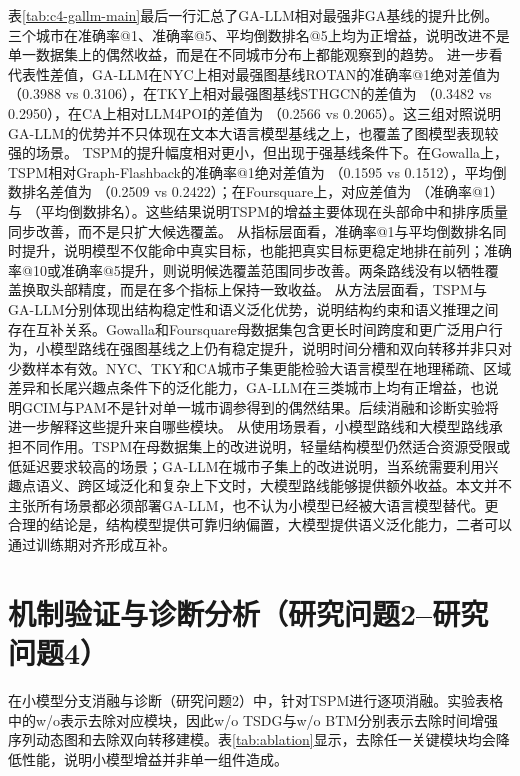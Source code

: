表\ref{tab:c4-gallm-main}最后一行汇总了GA-LLM相对最强非GA基线的提升比例。三个城市在准确率@1、准确率@5、平均倒数排名@5上均为正增益，说明改进不是单一数据集上的偶然收益，而是在不同城市分布上都能观察到的趋势。
进一步看代表性差值，GA-LLM在NYC上相对最强图基线ROTAN的准确率@1绝对差值为 （0.3988 vs 0.3106），在TKY上相对最强图基线STHGCN的差值为 （0.3482 vs 0.2950），在CA上相对LLM4POI的差值为 （0.2566 vs 0.2065）。这三组对照说明GA-LLM的优势并不只体现在文本大语言模型基线之上，也覆盖了图模型表现较强的场景。
TSPM的提升幅度相对更小，但出现于强基线条件下。在Gowalla上，TSPM相对Graph-Flashback的准确率@1绝对差值为 （0.1595 vs 0.1512），平均倒数排名差值为 （0.2509 vs 0.2422）；在Foursquare上，对应差值为 （准确率@1）与 （平均倒数排名）。这些结果说明TSPM的增益主要体现在头部命中和排序质量同步改善，而不是只扩大候选覆盖。
从指标层面看，准确率@1与平均倒数排名同时提升，说明模型不仅能命中真实目标，也能把真实目标更稳定地排在前列；准确率@10或准确率@5提升，则说明候选覆盖范围同步改善。两条路线没有以牺牲覆盖换取头部精度，而是在多个指标上保持一致收益。
从方法层面看，TSPM与GA-LLM分别体现出结构稳定性和语义泛化优势，说明结构约束和语义推理之间存在互补关系。Gowalla和Foursquare母数据集包含更长时间跨度和更广泛用户行为，小模型路线在强图基线之上仍有稳定提升，说明时间分槽和双向转移并非只对少数样本有效。NYC、TKY和CA城市子集更能检验大语言模型在地理稀疏、区域差异和长尾兴趣点条件下的泛化能力，GA-LLM在三类城市上均有正增益，也说明GCIM与PAM不是针对单一城市调参得到的偶然结果。后续消融和诊断实验将进一步解释这些提升来自哪些模块。
从使用场景看，小模型路线和大模型路线承担不同作用。TSPM在母数据集上的改进说明，轻量结构模型仍然适合资源受限或低延迟要求较高的场景；GA-LLM在城市子集上的改进说明，当系统需要利用兴趣点语义、跨区域泛化和复杂上下文时，大模型路线能够提供额外收益。本文并不主张所有场景都必须部署GA-LLM，也不认为小模型已经被大语言模型替代。更合理的结论是，结构模型提供可靠归纳偏置，大模型提供语义泛化能力，二者可以通过训练期对齐形成互补。

\section{机制验证与诊断分析（研究问题2--研究问题4）}
在小模型分支消融与诊断（研究问题2）中，针对TSPM进行逐项消融。实验表格中的w/o表示去除对应模块，因此w/o TSDG与w/o BTM分别表示去除时间增强序列动态图和去除双向转移建模。表\ref{tab:ablation}显示，去除任一关键模块均会降低性能，说明小模型增益并非单一组件造成。

